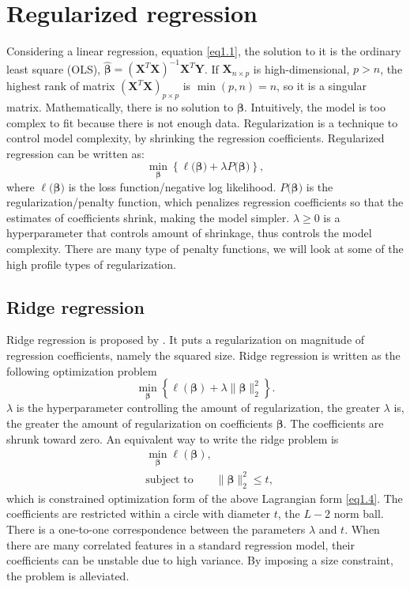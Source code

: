 \section{Regularized regression}
Considering a linear regression, equation \eqref{eq1.1}, the solution to it is the ordinary least square (OLS), $\hat{\bm{\beta}}=(\bm{X}^T\bm{X})^{-1}\bm{X}^T\bm{Y}$. If $\bm{X}_{n\times p}$ is high-dimensional, $p>n$, the highest rank of matrix $(\bm{X}^T\bm{X})_{p\times p}$ is $\min(p,n)=n$, so it is a singular matrix. Mathematically, there is no solution to $\bm{\beta}$. Intuitively, the model is too complex to fit because there is not enough data. Regularization is a technique to control model complexity, by shrinking the regression coefficients. Regularized regression can be written as:
\begin{equation}
    \min_{\bm{\beta}} \left\{\ell(\bm{\beta)} + \lambda P(\bm{\beta)}\right\}, \label{eq1.3}
\end{equation}
where $\ell(\bm{\beta)}$ is the loss function/negative log likelihood. $P(\bm{\beta)}$ is the regularization/penalty function, which penalizes regression coefficients so that the estimates of coefficients shrink, making the model simpler.  $\lambda \geq0$ is a hyperparameter that controls amount of shrinkage, thus controls the model complexity. There are many type of penalty functions, we will look at some of the high profile types of regularization.

\subsection{Ridge regression}
Ridge regression is proposed by \cite{hoerl1970ridge}. It puts a regularization on magnitude of regression coefficients, namely the squared size. Ridge regression is written as the following optimization problem 
\begin{equation}
    \min_{\bm{\beta}} \left\{ \ell(\bm{\beta})+\lambda\|\bm{\beta}\|_2^2  \right\}. \label{eq1.4}
\end{equation}
$\lambda$ is the hyperparameter controlling the amount of regularization, the greater $\lambda$ is, the greater the amount of regularization on coefficients $\bm{\beta}$. The coefficients are shrunk toward zero. An equivalent way to write the ridge problem is 
\begin{equation}
    \begin{aligned}
    &\min_{\bm{\beta}} \ell(\bm{\beta}), \\
    &\text{subject to} \qquad \|\bm{\beta}\|_2^2 \leq t, \label{eq1.5}
    \end{aligned}
\end{equation}
which is constrained optimization form of the above Lagrangian form \eqref{eq1.4}. The coefficients are restricted within a circle with diameter $t$, the $L-2$ norm ball. There is a one-to-one correspondence between the parameters $\lambda$ and $t$. When there are many correlated features in a standard regression model, their coefficients can be unstable due to high variance. By imposing a size constraint, the problem is alleviated. 

